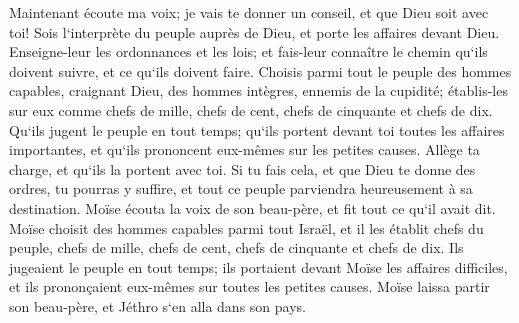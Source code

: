 \verse Maintenant écoute ma voix; je vais te donner un conseil, et que Dieu soit avec toi! Sois l`interprète du peuple auprès de Dieu, et porte les affaires devant Dieu. 
\verse Enseigne-leur les ordonnances et les lois; et fais-leur connaître le chemin qu`ils doivent suivre, et ce qu`ils doivent faire. 
\verse Choisis parmi tout le peuple des hommes capables, craignant Dieu, des hommes intègres, ennemis de la cupidité; établis-les sur eux comme chefs de mille, chefs de cent, chefs de cinquante et chefs de dix. 
\verse Qu`ils jugent le peuple en tout temps; qu`ils portent devant toi toutes les affaires importantes, et qu`ils prononcent eux-mêmes sur les petites causes. Allège ta charge, et qu`ils la portent avec toi. 
\verse Si tu fais cela, et que Dieu te donne des ordres, tu pourras y suffire, et tout ce peuple parviendra heureusement à sa destination. 
\verse Moïse écouta la voix de son beau-père, et fit tout ce qu`il avait dit. 
\verse Moïse choisit des hommes capables parmi tout Israël, et il les établit chefs du peuple, chefs de mille, chefs de cent, chefs de cinquante et chefs de dix. 
\verse Ils jugeaient le peuple en tout temps; ils portaient devant Moïse les affaires difficiles, et ils prononçaient eux-mêmes sur toutes les petites causes. 
\verse Moïse laissa partir son beau-père, et Jéthro s`en alla dans son pays. 

